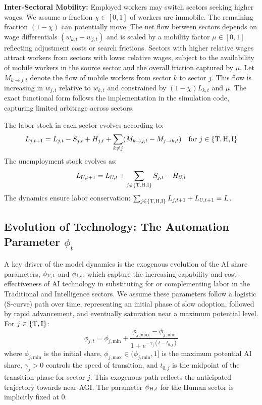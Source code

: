 \documentclass{article}
\newcommand{\sector}[1]{\textnormal{#1}}
\begin{document}
\noindent
\textbf{Inter-Sectoral Mobility:} Employed workers may switch sectors seeking higher wages. 
We assume a fraction $\chi \in [0,1]$ of workers are immobile. 
The remaining fraction $(1-\chi)$ can potentially move. 
The net flow between sectors depends on wage differentials $(w_{k,t} - w_{j,t})$ and is scaled by a mobility factor $\mu \in [0,1]$ reflecting adjustment costs or search frictions. 
Sectors with higher relative wages attract workers from sectors with lower relative wages, subject to the availability of mobile workers in the source sector and the overall friction captured by $\mu$. 
Let $M_{k \to j, t}$ denote the flow of mobile workers from sector $k$ to sector $j$. 
This flow is increasing in $w_{j,t}$ relative to $w_{k,t}$ and constrained by $(1-\chi)L_{k,t}$ and $\mu$. 
The exact functional form follows the implementation in the simulation code, capturing limited arbitrage across sectors.

The labor stock in each sector evolves according to:
\begin{equation}
L_{j,t+1} = L_{j,t} - S_{j,t} + H_{j,t} + \sum_{k \neq j} (M_{k \to j, t} - M_{j \to k, t}) \quad \text{for } j \in \{\sector{T}, \sector{H}, \sector{I}\} \label{eq:labor_accum_j}
\end{equation}
The unemployment stock evolves as:
\begin{equation}
L_{U,t+1} = L_{U,t} + \sum_{j \in \{\sector{T,H,I}\}} S_{j,t} - H_{U,t} \label{eq:labor_accum_U}
\end{equation}
The dynamics ensure labor conservation: $\sum_{j \in \{\sector{T,H,I}\}} L_{j,t+1} + L_{U,t+1} = L$.

\subsection{Evolution of Technology: The Automation Parameter \texorpdfstring{$\phi_t$}{phi\_t}}
A key driver of the model dynamics is the exogenous evolution of the AI share parameters, $\phi_{\sector{T},t}$ and $\phi_{\sector{I},t}$, which capture the increasing capability and cost-effectiveness of AI technology in substituting for or complementing labor in the Traditional and Intelligence sectors. 
We assume these parameters follow a logistic (S-curve) path over time, representing an initial phase of slow adoption, followed by rapid advancement, and eventually saturation near a maximum potential level. 
For $j \in \{\sector{T}, \sector{I}\}$:
\begin{equation}
\phi_{j,t} = \phi_{j,\text{min}} + \frac{\phi_{j,\text{max}} - \phi_{j,\text{min}}}{1 + e^{-\gamma_j (t - t_{0,j})}} \label{eq:phi_evolution}
\end{equation}
where $\phi_{j,\text{min}}$ is the initial share, $\phi_{j,\text{max}} \in (\phi_{j,\text{min}}, 1]$ is the maximum potential AI share, $\gamma_j > 0$ controls the speed of transition, and $t_{0,j}$ is the midpoint of the transition phase for sector $j$. 
This exogenous path reflects the anticipated trajectory towards near-AGI. The parameter $\phi_{\sector{H},t}$ for the Human sector is implicitly fixed at 0.
\end{document}
